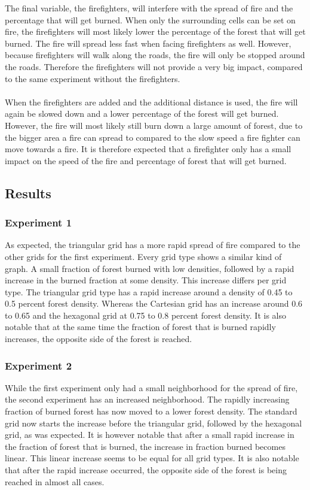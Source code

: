 \documentclass{article}
\begin{document}
\begin{multicols}{2}
The final variable, the firefighters, will interfere with the spread of fire and the percentage that will get burned. When only the surrounding cells can be set on fire, the firefighters will most likely lower the percentage of the forest that will get burned. The fire will spread less fast when facing firefighters as well. However, because firefighters will walk along the roads, the fire will only be stopped around the roads. Therefore the firefighters will not provide a very big impact, compared to the same experiment without the firefighters.\\\\
When the firefighters are added and the additional distance is used, the fire will again be slowed down and a lower percentage of the forest will get burned. However, the fire will most likely still burn down a large amount of forest, due to the bigger area a fire can spread to compared to the slow speed a fire fighter can move towards a fire. It is therefore expected that a firefighter only has a small impact on the speed of the fire and percentage of forest that will get burned.


\subsection*{Results}
\subsubsection*{Experiment 1}
As expected, the triangular grid has a more rapid spread of fire compared to the other grids for the first experiment. Every grid type shows a similar kind of graph. A small fraction of forest burned with low densities, followed by a rapid increase in the burned fraction at some density. This increase differs per grid type. The triangular grid type has a rapid increase around a density of 0.45 to 0.5 percent forest density. Whereas the Cartesian grid has an increase around 0.6 to 0.65 and the hexagonal grid at 0.75 to 0.8 percent forest density. It is also notable that at the same time the fraction of forest that is burned rapidly increases, the opposite side of the forest is reached.
\subsubsection*{Experiment 2}
While the first experiment only had a small neighborhood for the spread of fire, the second experiment has an increased neighborhood. The rapidly increasing fraction of burned forest has now moved to a lower forest density. The standard grid now starts the increase before the triangular grid, followed by the hexagonal grid, as was expected. It is however notable that after a small rapid increase in the fraction of forest that is burned, the increase in fraction burned becomes linear. This linear increase seems to be equal for all grid types. It is also notable that after the rapid increase occurred, the opposite side of the forest is being reached in almost all cases.

\end{multicols}
\end{document}
